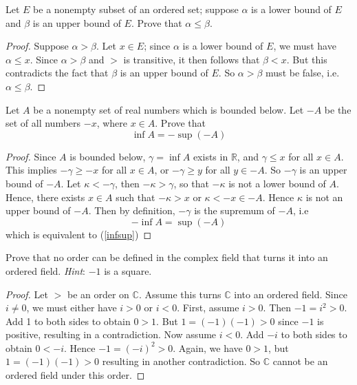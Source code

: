 \documentclass[12pt]{article}
\newenvironment{problem}[2][Problem]{\begin{trivlist}
\item[\hskip \labelsep {\bfseries #1}\hskip \labelsep {\bfseries #2.}]}{\end{trivlist}}
\begin{document}
\begin{problem}{4}
Let $E$ be a nonempty subset of an ordered set; suppose $\alpha$ is a lower bound of $E$ and $\beta$ is an upper bound of $E$.  Prove that $\alpha\leq\beta$.
\end{problem}
\begin{proof}
Suppose $\alpha > \beta$.  Let $x\in E$; since $\alpha$ is a lower bound of $E$, we must have $\alpha \leq x$.  Since $\alpha > \beta$ and $>$ is transitive, it then follows that $\beta < x$.  But this contradicts the fact that $\beta$ is an upper bound of $E$.  So $\alpha > \beta$ must be false, i.e. $\alpha \leq \beta$.
\end{proof}
\begin{problem}{5}
Let $A$ be a nonempty set of real numbers which is bounded below.  Let $-A$ be the set of all numbers $-x$, where $x\in A$.  Prove that
\begin{equation}\label{infsup}
\inf A = -\sup(-A)
\end{equation}
\end{problem}
\begin{proof}
Since $A$ is bounded below, $\gamma = \inf A$ exists in $\mathbb{R}$, and $\gamma\leq x$ for all $x \in A$.  This implies $-\gamma \geq -x$ for all $x \in A$, or $-\gamma \geq y$ for all $y \in -A$.  So $-\gamma$ is an upper bound of $-A$.  Let $\kappa < -\gamma$, then $-\kappa > \gamma$, so that $-\kappa$ is not a lower bound of $A$.  Hence, there exists $x \in A$ such that $-\kappa > x$ or $\kappa < -x \in -A$.  Hence $\kappa$ is not an upper bound of $-A$.  Then by definition, $-\gamma$ is the supremum of $-A$, i.e
\begin{equation}
-\inf A = \sup(-A)
\end{equation}
which is equivalent to (\ref{infsup})
\end{proof}
\begin{problem}{6}
\end{problem}
\begin{problem}{7}

\end{problem}
\begin{problem}{8}
Prove that no order can be defined in the complex field that turns it into an ordered field.  \emph{Hint}: $-1$ is a square.
\end{problem}
\begin{proof}
Let $>$ be an order on $\mathbb{C}$.  Assume this turns $\mathbb{C}$ into an ordered field.  Since $i \neq 0$, we must either have $i > 0$ or $i < 0$.  First, assume $i > 0$.  Then $-1 = i^2 > 0$.  Add 1 to both sides to obtain $0 > 1$.  But $1 = (-1)(-1) > 0$ since $-1$ is positive, resulting in a contradiction.  Now assume $i < 0$.  Add $-i$ to both sides to obtain $0 < -i$.  Hence $-1 = (-i)^2 > 0$.  Again, we have $0 > 1$, but $1 = (-1)(-1) > 0$ resulting in another contradiction.  So $\mathbb{C}$ cannot be an ordered field under this order.
\end{proof}
\end{document}
